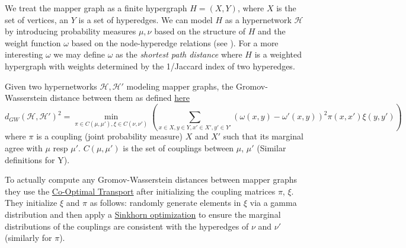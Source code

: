 \documentclass{article}
\begin{document}
We treat the mapper graph as a finite hypergraph $H=(X,Y)$, where $X$ is the set of vertices, an $Y$ is a set of hyperedges. We can model $H$ as a hypernetwork $\mathcal{H}$ by introducing probability measures $\mu, \nu$ based on the structure of $H$ and the weight function $\omega$ based on the node-hyperedge relations (see \cite[Figure 4]{mapper-AI-activations}). For a more interesting $\omega$ we may define $\omega$ as the \emph{shortest path distance} where $H$ is a weighted hypergraph with weights determined by the 1/Jaccard index of two hyperedges.

Given two hypernetworks $\mathcal{H}, \mathcal{H}'$ modeling mapper graphs, the Gromov-Wasserstein distance between them as defined \href{https://arxiv.org/pdf/2112.03904}{here}
$$ d_{GW}(\mathcal{H},\mathcal{H}')^2=\min_{\pi\in C(\mu,\mu'),\xi\in C(\nu,\nu')}
\left(\sum_{x\in X, y\in Y, x'\in X', y'\in Y'} 
(\omega(x,y)-\omega'(x,y))^2
\pi(x,x')\xi(y,y')
\right)$$
where $\pi$ is a coupling (joint probability measure) $X$ and $X'$ such that its marginal agree with $\mu$ resp $\mu'$. $C(\mu,\mu')$ is the set of couplings between $\mu$, $\mu'$ (Similar definitions for Y).

To actually compute any Gromov-Wasserstein distances between mapper graphs they use the \href{https://arxiv.org/pdf/2002.03731}{Co-Optimal Transport} after initializing the coupling matrices $\pi$, $\xi$. They initialize $\xi$ and $\pi$ as follows: randomly generate elements in $\xi$ via a gamma distribution and then apply a \href{https://arxiv.org/pdf/1306.0895}{Sinkhorn optimization} to ensure the marginal distributions of the couplings are consistent with the hyperedges of $\nu$ and $\nu'$ (similarly for $\pi$).




\end{document}

